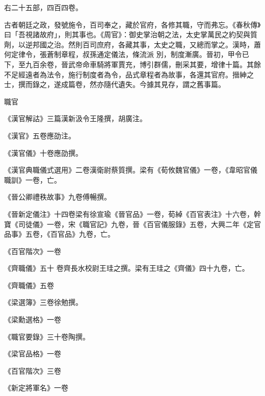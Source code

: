 \begin{pinyinscope}
 右二十五部，四百四卷。



 古者朝廷之政，發號施令，百司奉之，藏於官府，各修其職，守而弗忘。《春秋傳》曰「吾視諸故府」，則其事也。《周官》：御史掌治朝之法，太史掌萬民之約契與質劑，以逆邦國之治。然則百司庶府，各藏其事，太史之職，又總而掌之。漢時，蕭何定律令，張蒼制章程，叔孫通定儀法，條流派
 別，制度漸廣。晉初，甲令已下，至九百余卷，晉武帝命車騎將軍賈充，博引群儒，刪采其要，增律十篇。其餘不足經遠者為法令，施行制度者為令，品式章程者為故事，各還其官府。搢紳之士，撰而錄之，遂成篇卷，然亦隨代遺失。今據其見存，謂之舊事篇。



 職官



 《漢官解詁》三篇漢新汲令王隆撰，胡廣注。



 《漢官》五卷應劭注。



 《漢官儀》十卷應劭撰。



 《漢官典職儀式選用》二卷漢衛尉蔡質撰。梁有《荀攸魏官儀》一卷，《韋昭官儀職訓》一卷，亡。



 《晉公卿禮秩故事》九卷傅暢撰。



 《晉新定儀注》十四卷梁有徐宣瑜《晉官品》一卷，荀綽《百官表注》十六卷，幹寶《司徒儀》一卷，宋《職官記》九卷，晉《百官儀服錄》五卷，大興二年《定官品事》五卷，《百官品》九卷，亡。



 《百官階次》一卷



 《齊職儀》五十
 卷齊長水校尉王珪之撰。梁有王珪之《齊儀》四十九卷，亡。



 《齊職儀》五卷



 《梁選簿》三卷徐勉撰。



 《梁勳選格》一卷



 《職官要錄》三十卷陶撰。



 《梁官品格》一卷



 《百官階次》三卷



 《新定將軍名》一卷




\end{pinyinscope}
